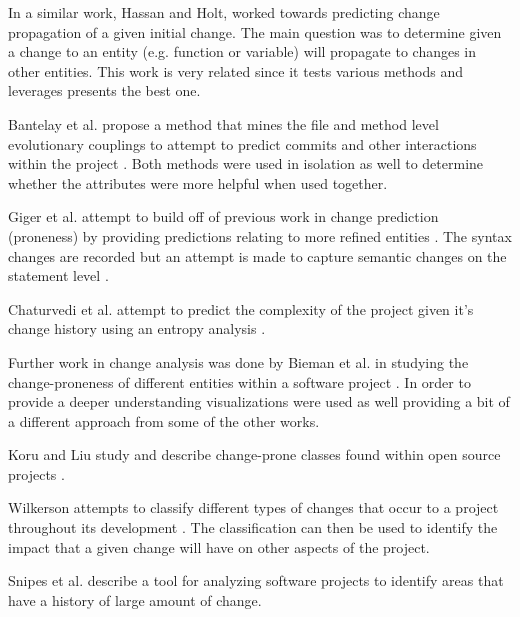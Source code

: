 In a similar work, Hassan and Holt, worked towards predicting change propagation of a given initial change. \cite{Hassan2004} The main question was to determine given a change to an entity (e.g. function or variable) will propagate to changes in other entities. This work is very related since it tests various methods and leverages presents the best one.

Bantelay et al. propose a method that mines the file and method level evolutionary couplings to attempt to predict commits and other interactions within the project \cite{Bantelay2013}. Both methods were used in isolation as well to determine whether the attributes were more helpful when used together.

Giger et al. attempt to build off of previous work in change prediction (proneness) by providing predictions relating to more refined entities \cite{Giger2012}. The syntax changes are recorded but an attempt is made to capture semantic changes on the statement level \cite{Giger2012}.

Chaturvedi et al. attempt to predict the complexity of the project given it's change history using an entropy analysis \cite{Chaturvedi2014}.

Further work in change analysis was done by Bieman et al. in studying the change-proneness of different entities within a software project \cite{Bieman2003}. In order to provide a deeper understanding visualizations were used as well providing a bit of a different approach from some of the other works.

Koru and Liu study and describe change-prone classes found within open source projects \cite{GunesKoru2007}.

Wilkerson attempts to classify different types of changes that occur to a project throughout its development \cite{Wilkerson2012}. The classification can then be used to identify the impact that a given change will have on other aspects of the project.

Snipes et al. describe a tool for analyzing software projects to identify areas that have a history of large amount of change. \cite{Snipes2011}








